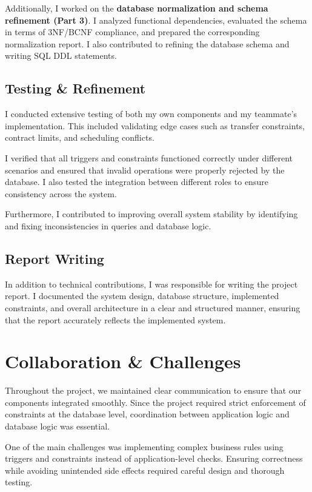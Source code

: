 \documentclass[12pt, a4paper]{article}
\begin{document}
Additionally, I worked on the \textbf{database normalization and schema refinement (Part 3)}. I analyzed functional dependencies, evaluated the schema in terms of 3NF/BCNF compliance, and prepared the corresponding normalization report. I also contributed to refining the database schema and writing SQL DDL statements.

\subsection*{Testing \& Refinement}

I conducted extensive testing of both my own components and my teammate’s implementation. This included validating edge cases such as transfer constraints, contract limits, and scheduling conflicts.

I verified that all triggers and constraints functioned correctly under different scenarios and ensured that invalid operations were properly rejected by the database. I also tested the integration between different roles to ensure consistency across the system.

Furthermore, I contributed to improving overall system stability by identifying and fixing inconsistencies in queries and database logic.

\subsection*{Report Writing}

In addition to technical contributions, I was responsible for writing the project report. I documented the system design, database structure, implemented constraints, and overall architecture in a clear and structured manner, ensuring that the report accurately reflects the implemented system.

\section*{Collaboration \& Challenges}

Throughout the project, we maintained clear communication to ensure that our components integrated smoothly. Since the project required strict enforcement of constraints at the database level, coordination between application logic and database logic was essential.

One of the main challenges was implementing complex business rules using triggers and constraints instead of application-level checks. Ensuring correctness while avoiding unintended side effects required careful design and thorough testing.
\end{document}
